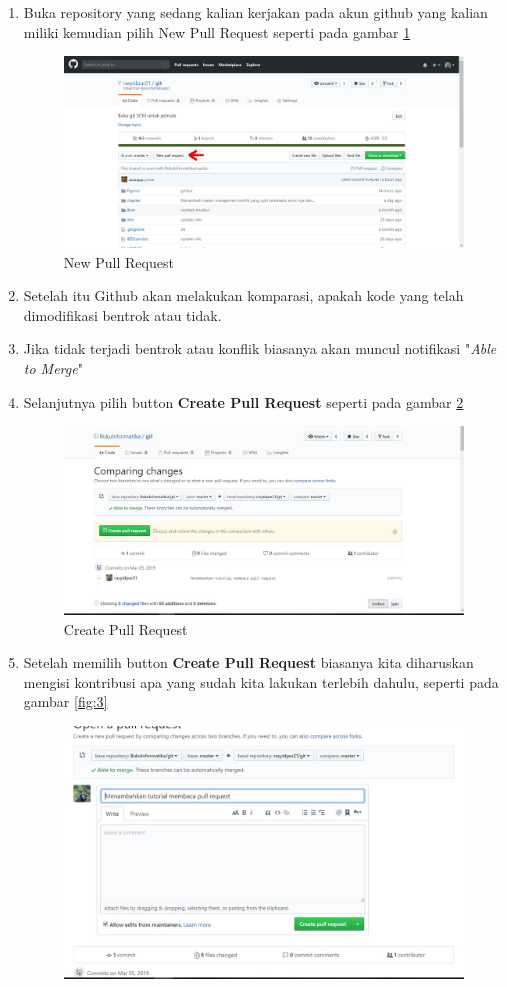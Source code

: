\begin{enumerate}
\item Buka repository yang sedang kalian kerjakan pada akun github yang kalian miliki kemudian pilih New Pull Request seperti pada gambar \subitem
\ref{fig:newpull}
\subitem
\begin{figure}[!htbp]
\centerline{\includegraphics[width=.75\textwidth]{Figures/membacapr/1.JPG}}
\caption{New Pull Request}
\label{fig:newpull}
\end{figure}
\item Setelah itu Github akan melakukan komparasi, apakah kode yang telah dimodifikasi bentrok atau tidak.
\item Jika tidak terjadi bentrok atau konflik biasanya akan muncul notifikasi "\textit{Able to Merge}"
\item Selanjutnya pilih button \textbf{Create Pull Request} seperti pada gambar \ref{fig:create}
\subitem
\begin{figure}[!htbp]
\centerline{\includegraphics[width=.75\textwidth]{Figures/membacapr/2.JPG}}
\caption{Create Pull Request}
\label{fig:create}
\end{figure}
\item Setelah memilih button \textbf{Create Pull Request} biasanya kita diharuskan mengisi kontribusi apa yang sudah kita lakukan terlebih dahulu, seperti pada gambar \ref{fig:3}
\subitem
\begin{figure}[!htbp]
\centerline{\includegraphics[width=.75\textwidth]{Figures/membacapr/3.JPG}}

\end{figure}
\end{enumerate}
